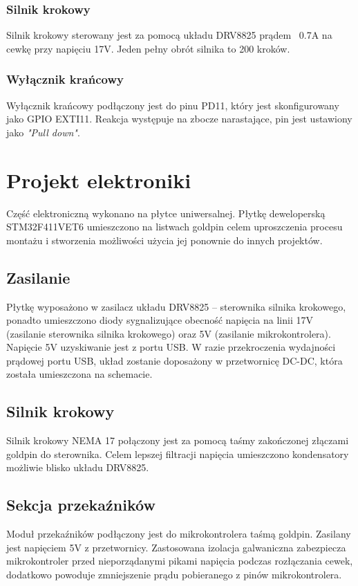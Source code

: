 \documentclass[10pt, a4paper]{article}
\begin{document}
\subsubsection{Silnik krokowy}
Silnik krokowy sterowany jest za pomocą układu DRV8825 prądem ~0.7A na cewkę przy napięciu 17V. Jeden pełny obrót silnika to 200 kroków. 

\subsubsection{Wyłącznik krańcowy}
Wyłącznik krańcowy podłączony jest do pinu PD11, który jest skonfigurowany jako GPIO EXTI11. Reakcja występuje na zbocze narastające, pin jest ustawiony jako \emph{"Pull down"}. 



\section{Projekt elektroniki}


Część elektroniczną wykonano na płytce uniwersalnej. Płytkę deweloperską STM32F411VET6 umieszczono na listwach goldpin celem uproszczenia procesu montażu i stworzenia możliwości użycia jej ponownie do innych projektów. 

\subsection{Zasilanie}
Płytkę wyposażono w zasilacz układu DRV8825 -- sterownika silnika krokowego, ponadto umieszczono diody sygnalizujące obecność napięcia na linii 17V (zasilanie sterownika silnika krokowego) oraz 5V (zasilanie mikrokontrolera). Napięcie 5V uzyskiwanie jest z portu USB. W razie przekroczenia wydajności prądowej portu USB, układ zostanie doposażony w przetwornicę DC-DC, która została umieszczona na schemacie.

\subsection{Silnik krokowy}
Silnik krokowy NEMA 17 połączony jest za pomocą taśmy zakończonej złączami goldpin do sterownika. Celem lepszej filtracji napięcia umieszczono kondensatory możliwie blisko układu DRV8825.

\subsection{Sekcja przekaźników}
Moduł przekaźników podłączony jest do mikrokontrolera taśmą goldpin. Zasilany jest napięciem 5V z przetwornicy. Zastosowana izolacja galwaniczna zabezpiecza mikrokontroler przed nieporządanymi pikami napięcia podczas rozłączania cewek, dodatkowo powoduje zmniejszenie prądu pobieranego z pinów mikrokontrolera.
\end{document}
